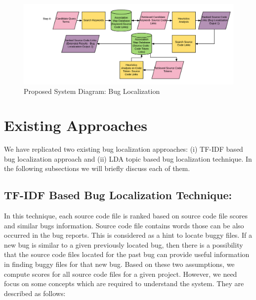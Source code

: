 \documentclass{sig-alternate}
\begin{document}
\begin{figure}
\centering
\includegraphics[scale=0.3]{Localization}
\caption{Proposed System Diagram: Bug Localization}
\label{fig:BL}
\end{figure}
\section{Existing Approaches}
We have replicated two existing bug localization approaches: (i) TF-IDF based bug localization approach and (ii) LDA topic based bug localization technique. In the following subsections we will briefly discuss each of them.
\subsection{TF-IDF Based Bug Localization Technique:}
In this technique, each source code file is ranked based on source code file scores and similar bugs information. Source code file contains words those can be also occurred in the bug reports. This is considered as a hint to locate buggy files. If a new bug is similar to a given previously located bug, then there is a possibility that the source code files located for the past bug can provide useful information in finding buggy files for that new bug. Based on these two assumptions, we compute scores for all source code files for a given project. However, we need focus on some concepts which are required to understand the  system. They are described as follows:
\end{document}

